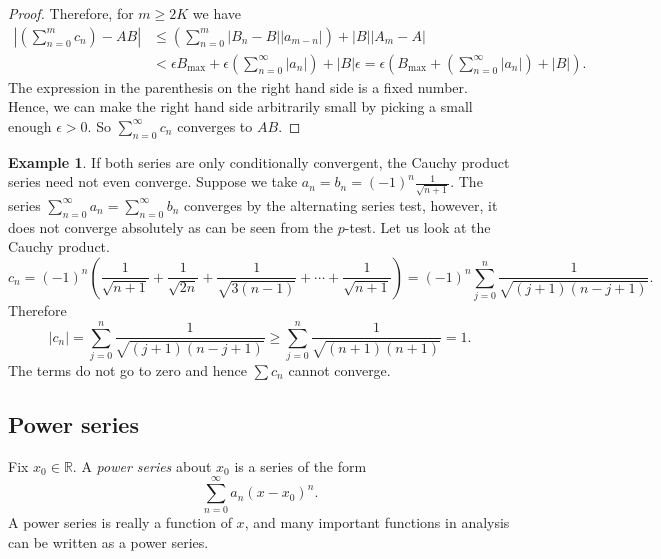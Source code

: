 \documentclass[12pt]{book}
\newcommand{\abs}[1]{\left\lvert {#1} \right\rvert}
\newcommand{\R}{{\mathbb{R}}}
\newcommand{\myindex}[1]{#1\index{#1}}
\theoremstyle{plain}
\theoremstyle{remark}
\theoremstyle{definition}
\theoremstyle{exercise}
\theoremstyle{example}
\newtheorem{example}[thm]{Example}
\begin{document}
\begin{proof}
Therefore, for $m \geq 2K$ we have
\begin{equation*}
\begin{split}
\abs{\left(\sum_{n=0}^m c_n \right) - AB}
& \leq
\left(
\sum_{n=0}^m
  \abs{ B_n -  B } \abs{a_{m-n}}
\right)
+
\abs{B}\abs{A_m - A}
\\
& <
\epsilon
B_{\text{max}}
+
\epsilon
\left(
\sum_{n=0}^\infty \abs{a_{n}}
\right)
+
\abs{B}\epsilon
=
\epsilon 
\left(
B_{\text{max}}
+
\left(
\sum_{n=0}^\infty \abs{a_{n}}
\right)
+
\abs{B}
\right) .
\end{split}
\end{equation*}
The expression in the parenthesis on the right hand side
is a fixed number.
Hence,
we can make the right hand side arbitrarily small by picking a small enough
$\epsilon> 0$.  So $\sum_{n=0}^\infty c_n$ converges to $AB$.
\end{proof}

\begin{example}
If both series are only conditionally convergent, the Cauchy product series
need not even converge.
Suppose we take $a_n = b_n = {(-1)}^n \frac{1}{\sqrt{n+1}}$.
The series $\sum_{n=0}^\infty a_n = \sum_{n=0}^\infty b_n$
converges
by the alternating series test, however, it does not converge
absolutely as can be seen from the $p$-test.  Let us look
at the Cauchy product.
\begin{equation*}
c_n = 
{(-1)}^n
\left(
\frac{1}{\sqrt{n+1}} + 
\frac{1}{\sqrt{2n}} + 
\frac{1}{\sqrt{3(n-1)}} + \cdots +
\frac{1}{\sqrt{n+1}}
\right)
=
{(-1)}^n
\sum_{j=0}^n \frac{1}{\sqrt{(j+1)(n-j+1)}} .
\end{equation*}
Therefore
\begin{equation*}
\abs{c_n} 
=
\sum_{j=0}^n \frac{1}{\sqrt{(j+1)(n-j+1)}} 
\geq
\sum_{j=0}^n \frac{1}{\sqrt{(n+1)(n+1)}} 
= 1 .
\end{equation*}
The terms do not go to zero and hence $\sum c_n$ cannot converge.
\end{example}

\subsection{Power series}

Fix $x_0 \in \R$.
A \emph{\myindex{power series}} about $x_0$
is a series of the form
\begin{equation*}
\sum_{n=0}^\infty a_n {(x-x_0)}^n .
\end{equation*}
A power series is really a function of $x$, and
many important functions in analysis can be written
as a power series.
\end{document}
